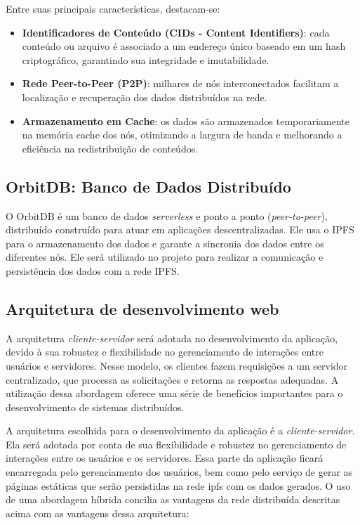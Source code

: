 Entre suas principais características, destacam-se:

\begin{itemize}
    \item \textbf{Identificadores de Conteúdo (CIDs - Content Identifiers)}: cada conteúdo ou arquivo é associado a um endereço único baseado em um hash criptográfico, garantindo sua integridade e imutabilidade.
    
    \item \textbf{Rede Peer-to-Peer (P2P)}: milhares de nós interconectados facilitam a localização e recuperação dos dados distribuídos na rede.
    
    \item \textbf{Armazenamento em Cache}: os dados são armazenados temporariamente na memória cache dos nós, otimizando a largura de banda e melhorando a eficiência na redistribuição de conteúdos.
\end{itemize}

\subsection{OrbitDB: Banco de Dados Distribuído}

O OrbitDB é um banco de dados \textit{serverless} e ponto a ponto (\textit{peer-to-peer}), distribuído construído para atuar em aplicações descentralizadas. Ele usa o IPFS para o armazenamento dos dados e garante a sincronia dos dados entre os diferentes nós. Ele será utilizado no projeto para realizar a comunicação e persistência dos dados com a rede IPFS.

\subsection{Arquitetura de desenvolvimento web}


A arquitetura \textit{cliente-servidor} será adotada no desenvolvimento da aplicação, devido à sua robustez e flexibilidade no gerenciamento de interações entre usuários e servidores. Nesse modelo, os clientes fazem requisições a um servidor centralizado, que processa as solicitações e retorna as respostas adequadas. A utilização dessa abordagem oferece uma série de benefícios importantes para o desenvolvimento de sistemas distribuídos.


A arquitetura escolhida para o desenvolvimento da aplicação é a \textit{cliente-servidor}. Ela será adotada por conta de sua flexibilidade e robustez no gerenciamento de interações entre os usuários e os servidores. Essa parte da aplicação ficará encarregada pelo gerenciamento dos usuários, bem como pelo serviço de gerar as páginas estáticas que serão persistidas na rede ipfs com os dados gerados. O uso de uma abordagem híbrida concilia as vantagens da rede distribuída descritas acima com as vantagens dessa arquitetura:

